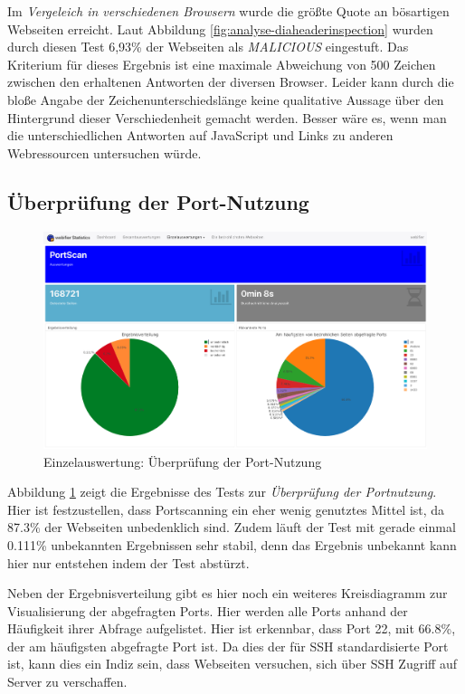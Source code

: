 Im \textit{Vergeleich in verschiedenen Browsern} wurde die größte Quote an bösartigen Webseiten
erreicht. Laut Abbildung \ref{fig:analyse-diaheaderinspection} wurden durch diesen Test 6,93\% der
Webseiten als \textit{MALICIOUS} eingestuft. Das Kriterium für dieses Ergebnis ist eine maximale
Abweichung von 500 Zeichen zwischen den erhaltenen Antworten der diversen Browser. Leider kann durch die bloße Angabe der Zeichenunterschiedslänge keine
qualitative Aussage über den Hintergrund dieser Verschiedenheit gemacht werden. Besser wäre es,
wenn man die unterschiedlichen Antworten auf JavaScript und Links zu anderen Webressourcen untersuchen würde.

\subsection{Überprüfung der Port-Nutzung}

\begin{figure}[H]
  \centering
  \includegraphics[width=\textwidth]{images/stats/portscan}
  \caption[Einzelauswertung: Überprüfung der Port-Nutzung]{Einzelauswertung: Überprüfung der Port-Nutzung\protect\footnotemark}
  \label{fig:analyse-portscan}
\end{figure}

Abbildung \ref{fig:analyse-portscan} zeigt die Ergebnisse des Tests zur \textit{Überprüfung der
Portnutzung}.
Hier ist festzustellen, dass Portscanning ein eher wenig genutztes Mittel ist, da 87.3\% der Webseiten unbedenklich sind. Zudem läuft der Test mit gerade einmal 0.111\% unbekannten Ergebnissen sehr stabil, denn das Ergebnis unbekannt kann hier nur entstehen indem der Test abstürzt.

Neben der Ergebnisverteilung gibt es hier noch ein weiteres Kreisdiagramm zur Visualisierung der abgefragten Ports. Hier werden alle Ports anhand der Häufigkeit ihrer Abfrage aufgelistet. Hier ist erkennbar, dass Port 22, mit 66.8\%, der am häufigsten abgefragte Port ist. Da dies der für \ac{SSH} standardisierte Port ist, kann dies ein Indiz sein, dass Webseiten versuchen, sich über \ac{SSH} Zugriff auf Server zu verschaffen.

